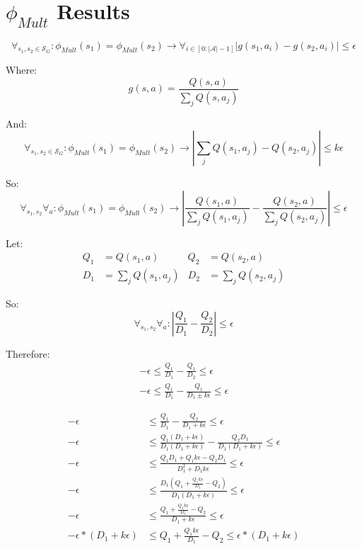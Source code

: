 \documentclass[11pt]{amsart}
\begin{document}
\section{$\phi_{Mult}$ Results}

\begin{equation}
\forall_{s_1, s_2 \in \mathcal{S}_G} : \phi_{Mult}(s_1) = \phi_{Mult}(s_2) \rightarrow \forall_{i \in [0:|\mathcal{A}| - 1]} | g(s_1, a_i) - g(s_2, a_i) | \leq \epsilon
\label{eq:phi_d}
\end{equation}

Where:
\begin{equation}
g(s,a) = \frac{Q(s,a)}{\sum_j Q(s,a_j)}
\end{equation}

And:
\begin{equation}
\forall_{s_1, s_2 \in \mathcal{S}_G} : \phi_{Mult}(s_1) = \phi_{Mult}(s_2) \rightarrow |\sum_j Q(s_1,a_j) - Q(s_2,a_j) | \leq k\epsilon
\end{equation}

So:
\begin{equation}
\forall_{s_1,s_2} \forall_a : \phi_{Mult}(s_1) = \phi_{Mult}(s_2) \rightarrow | \frac{Q(s_1,a)}{\sum_j Q(s_1,a_j)} - \frac{Q(s_2,a)}{\sum_j Q(s_2,a_j)} | \leq \epsilon
\end{equation}

Let:
\begin{align}
Q_1 &= Q(s_1,a) &Q_2 &= Q(s_2,a) \\
D_1 &= \sum_j Q(s_1,a_j) &D_2 &= \sum_j Q(s_2,a_j) 
\end{align}

So:
\begin{equation}
\forall_{s_1,s_2} \forall_a : | \frac{Q_1}{D_1} - \frac{Q_2}{D_2} | \leq \epsilon
\end{equation}

Therefore:
\begin{align*}
-\epsilon \leq \frac{Q_1}{D_1} - \frac{Q_1}{D_2} \leq \epsilon \\
-\epsilon \leq \frac{Q_1}{D_1} - \frac{Q_1}{D_1 \pm k\epsilon} \leq \epsilon
\end{align*}

\encircle{+}
\begin{align*}
-\epsilon &\leq \frac{Q_1}{D_1} - \frac{Q_2}{D_1 + k\epsilon} \leq \epsilon \\
-\epsilon &\leq \frac{Q_1 (D_1 + k\epsilon)}{D_1(D_1 + k\epsilon)} - \frac{Q_2 D_1}{D_1 (D_1 + k\epsilon)} \leq \epsilon \\
-\epsilon &\leq \frac{Q_1 D_1 + Q_1 k \epsilon - Q_2 D_1}{D_1^2 + D_1 k \epsilon} \leq \epsilon \\
-\epsilon &\leq \frac{D_1 (Q_1 + \frac{Q_1 k \epsilon}{D_1} - Q_2)}{D_1 (D_1 + k \epsilon)} \leq \epsilon \\
-\epsilon &\leq \frac{Q_1 + \frac{Q_1 k \epsilon}{D_1} - Q_2}{D_1 + k \epsilon} \leq \epsilon \\
-\epsilon*(D_1 + k \epsilon) &\leq Q_1 + \frac{Q_1 k \epsilon}{D_1} - Q_2 \leq \epsilon*(D_1 + k \epsilon)
\end{align*}
\end{document}
